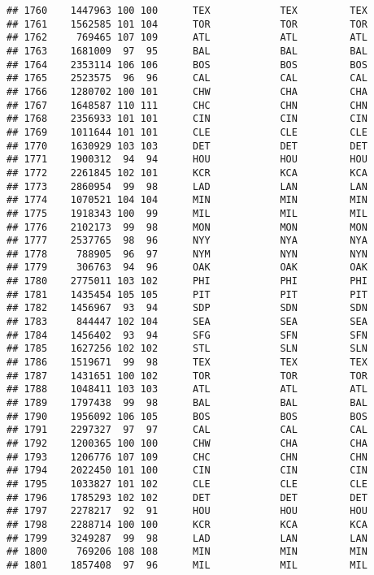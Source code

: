 \documentclass[]{article}
\begin{document}
\begin{verbatim}
## 1760    1447963 100 100      TEX            TEX         TEX
## 1761    1562585 101 104      TOR            TOR         TOR
## 1762     769465 107 109      ATL            ATL         ATL
## 1763    1681009  97  95      BAL            BAL         BAL
## 1764    2353114 106 106      BOS            BOS         BOS
## 1765    2523575  96  96      CAL            CAL         CAL
## 1766    1280702 100 101      CHW            CHA         CHA
## 1767    1648587 110 111      CHC            CHN         CHN
## 1768    2356933 101 101      CIN            CIN         CIN
## 1769    1011644 101 101      CLE            CLE         CLE
## 1770    1630929 103 103      DET            DET         DET
## 1771    1900312  94  94      HOU            HOU         HOU
## 1772    2261845 102 101      KCR            KCA         KCA
## 1773    2860954  99  98      LAD            LAN         LAN
## 1774    1070521 104 104      MIN            MIN         MIN
## 1775    1918343 100  99      MIL            MIL         MIL
## 1776    2102173  99  98      MON            MON         MON
## 1777    2537765  98  96      NYY            NYA         NYA
## 1778     788905  96  97      NYM            NYN         NYN
## 1779     306763  94  96      OAK            OAK         OAK
## 1780    2775011 103 102      PHI            PHI         PHI
## 1781    1435454 105 105      PIT            PIT         PIT
## 1782    1456967  93  94      SDP            SDN         SDN
## 1783     844447 102 104      SEA            SEA         SEA
## 1784    1456402  93  94      SFG            SFN         SFN
## 1785    1627256 102 102      STL            SLN         SLN
## 1786    1519671  99  98      TEX            TEX         TEX
## 1787    1431651 100 102      TOR            TOR         TOR
## 1788    1048411 103 103      ATL            ATL         ATL
## 1789    1797438  99  98      BAL            BAL         BAL
## 1790    1956092 106 105      BOS            BOS         BOS
## 1791    2297327  97  97      CAL            CAL         CAL
## 1792    1200365 100 100      CHW            CHA         CHA
## 1793    1206776 107 109      CHC            CHN         CHN
## 1794    2022450 101 100      CIN            CIN         CIN
## 1795    1033827 101 102      CLE            CLE         CLE
## 1796    1785293 102 102      DET            DET         DET
## 1797    2278217  92  91      HOU            HOU         HOU
## 1798    2288714 100 100      KCR            KCA         KCA
## 1799    3249287  99  98      LAD            LAN         LAN
## 1800     769206 108 108      MIN            MIN         MIN
## 1801    1857408  97  96      MIL            MIL         MIL

\end{verbatim}
\end{document}
